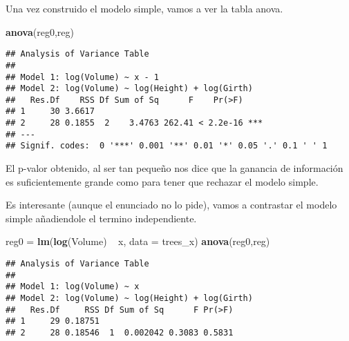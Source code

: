 \documentclass[]{article}
\newenvironment{Shaded}{\begin{snugshade}}{\end{snugshade}}
\newcommand{\KeywordTok}[1]{\textcolor[rgb]{0.13,0.29,0.53}{\textbf{{#1}}}}
\newcommand{\DataTypeTok}[1]{\textcolor[rgb]{0.13,0.29,0.53}{{#1}}}
\newcommand{\DecValTok}[1]{\textcolor[rgb]{0.00,0.00,0.81}{{#1}}}
\newcommand{\StringTok}[1]{\textcolor[rgb]{0.31,0.60,0.02}{{#1}}}
\newcommand{\NormalTok}[1]{{#1}}
\begin{document}
\begin{Shaded}
\end{Shaded}

Una vez construido el modelo simple, vamos a ver la tabla anova.

\begin{Shaded}
\begin{Highlighting}[]
\KeywordTok{anova}\NormalTok{(reg0,reg)}
\end{Highlighting}
\end{Shaded}

\begin{verbatim}
## Analysis of Variance Table
## 
## Model 1: log(Volume) ~ x - 1
## Model 2: log(Volume) ~ log(Height) + log(Girth)
##   Res.Df    RSS Df Sum of Sq      F    Pr(>F)    
## 1     30 3.6617                                  
## 2     28 0.1855  2    3.4763 262.41 < 2.2e-16 ***
## ---
## Signif. codes:  0 '***' 0.001 '**' 0.01 '*' 0.05 '.' 0.1 ' ' 1
\end{verbatim}

El p-valor obtenido, al ser tan pequeño nos dice que la ganancia de
información es suficientemente grande como para tener que rechazar el
modelo simple.

Es interesante (aunque el enunciado no lo pide), vamos a contrastar el
modelo simple añadiendole el termino independiente.

\begin{Shaded}
\begin{Highlighting}[]
\NormalTok{reg0 =}\StringTok{ }\KeywordTok{lm}\NormalTok{(}\KeywordTok{log}\NormalTok{(Volume) ~}\StringTok{ }\NormalTok{x, }\DataTypeTok{data =} \NormalTok{trees_x)}
\KeywordTok{anova}\NormalTok{(reg0,reg)}
\end{Highlighting}
\end{Shaded}

\begin{verbatim}
## Analysis of Variance Table
## 
## Model 1: log(Volume) ~ x
## Model 2: log(Volume) ~ log(Height) + log(Girth)
##   Res.Df     RSS Df Sum of Sq      F Pr(>F)
## 1     29 0.18751                           
## 2     28 0.18546  1  0.002042 0.3083 0.5831
\end{verbatim}
\end{document}
